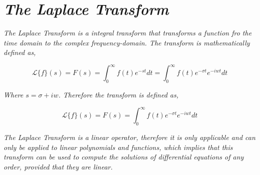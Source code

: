 

\section{\textit{The Laplace Transform}}

	\textit{The Laplace Transform is a integral transform that transforms a function fro the time domain to the complex frequency-domain. The transform is mathematically defined as,}

		$$\mathcal{L}\{f\}(s) = F(s) = \int_0^{\infty}f(t)e^{-st} dt = \int_0^{\infty}f(t)e^{-\sigma t}e^{-iwt} dt$$

	\textit{Where $s = \sigma + iw$. Therefore the transform is defined as,}
	
		$$\mathcal{L}\{f\}(s) = F(s) = \int_0^{\infty}f(t)e^{-\sigma t}e^{-iwt} dt$$
	
	\textit{The Laplace Transform is a linear operator, therefore it is only applicable and can only be applied to linear polynomials and functions, which implies that this transform can be used to compute the solutions of differential equations of any order, provided that they are linear.}
	
	
	